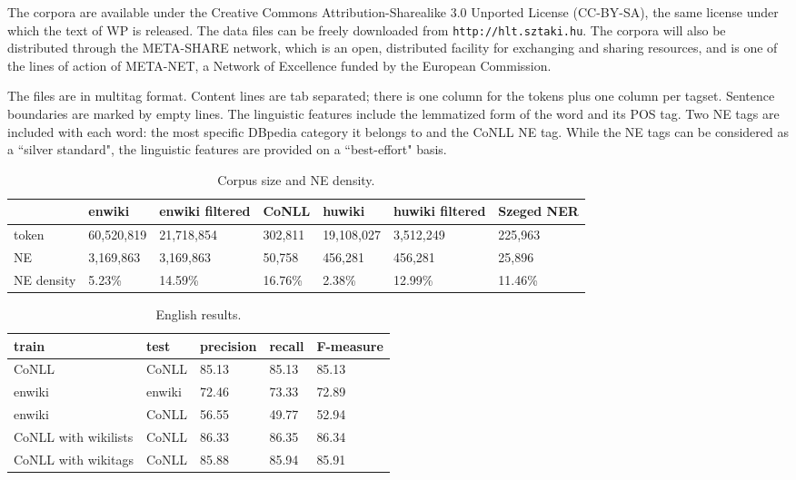 \documentclass[11pt]{article}
\begin{document}
The corpora are available under the Creative Commons Attribution-Sharealike
3.0 Unported License (CC-BY-SA), the same license under which the text of WP
is released. The data files can be freely downloaded from \texttt{http://hlt.sztaki.hu}. The corpora
will also be distributed through the META-SHARE network, which is an open,
distributed facility for exchanging and sharing resources, and is one of the
lines of action of META-NET, a Network of Excellence funded by the European
Commission.

The files are in multitag format. Content lines are tab separated; there is one column for the tokens plus one column per tagset. Sentence boundaries are marked by empty lines. The linguistic features include the lemmatized form of the word and its POS tag. Two NE tags are included with each word: the most specific DBpedia category it belongs to and the CoNLL NE tag. While the NE tags can be considered as a ``silver standard", the linguistic features are provided on a ``best-effort" basis.

\begin{table*}[ht]
\begin{center}
\begin{tabular}{lllllll}
\hline  & \bf enwiki & \bf enwiki filtered & \bf CoNLL & \bf huwiki & \bf huwiki filtered  & \bf Szeged NER \\ \hline
token & 60,520,819 & 21,718,854 & 302,811 &  19,108,027 & 3,512,249  & 225,963\\
NE & 3,169,863 & 3,169,863 & 50,758 & 456,281 & 456,281  & 25,896\\
NE density & 5.23\% & 14.59\% & 16.76\% & 2.38\% & 12.99\%  & 11.46\%\\
\hline
\end{tabular}
\end{center}
\caption{\label{size} Corpus size and NE density.}
\end{table*}

\begin{table*}[ht]
\begin{center}
\begin{tabular}{lllll}
\hline \bf train & \bf test & \bf precision & \bf recall & \bf F-measure \\ \hline
CoNLL & CoNLL & 85.13 & 85.13 & 85.13 \\
enwiki & enwiki & 72.46 & 73.33 &  72.89 \\
enwiki & CoNLL & 56.55 & 49.77 & 52.94 \\
CoNLL with wikilists & CoNLL & 86.33 & 86.35 & 86.34 \\
CoNLL with wikitags & CoNLL & 85.88 & 85.94 & 85.91 \\
\hline
\end{tabular}
\end{center}
\caption{\label{enresults} English results.}
\end{table*}
\end{document}
